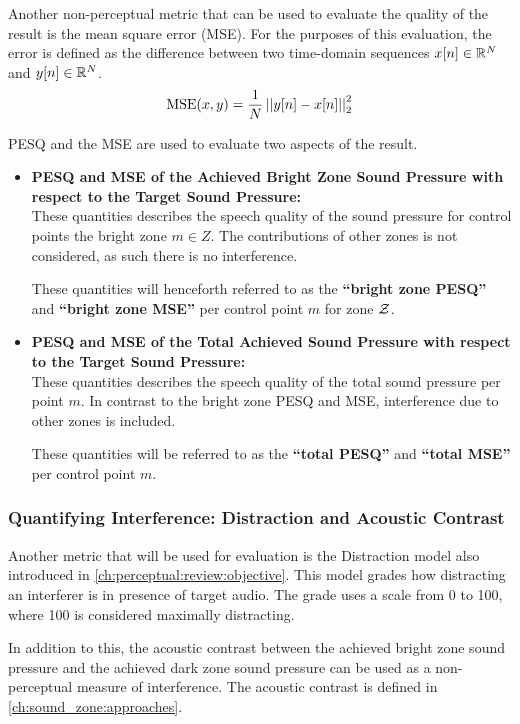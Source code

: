 Another non-perceptual metric that can be used to evaluate the quality of the result is the mean square error (MSE).
For the purposes of this evaluation, the error is defined as the difference between two time-domain sequences $x[n]\in\mathbb{R}^{N}$
and $y[n]\in\mathbb{R}^{N}$. 
\begin{equation}
    \text{MSE}(x,y) = \frac{1}{N}\norm[2][2]{y[n] - x[n]} 
\end{equation}

PESQ and the MSE are used to evaluate two aspects of the result.
\begin{itemize}
    \item \textbf{PESQ and MSE of the Achieved Bright Zone Sound Pressure with respect to the Target Sound Pressure:}\\
        These quantities describes the speech quality of the sound pressure for control points the bright zone $m\in Z$.
        The contributions of other zones is not considered, as such there is no interference.

        These quantities will henceforth referred to as the \textbf{``bright zone PESQ''} and \textbf{``bright zone MSE''} per control point $m$ for zone $\mathcal{Z}$.
    \item \textbf{PESQ and MSE of the Total Achieved Sound Pressure with respect to the Target Sound Pressure:}\\
        These quantities describes the speech quality of the total sound pressure per point $m$.
        In contrast to the bright zone PESQ and MSE, interference due to other zones is included.

        These quantities will be referred to as the \textbf{``total PESQ''} and \textbf{``total MSE''} per control point $m$. 
\end{itemize}

\subsubsection*{Quantifying Interference: Distraction and Acoustic Contrast}
Another metric that will be used for evaluation is the Distraction model also introduced in \autoref{ch:perceptual:review:objective}.
This model grades how distracting an interferer is in presence of target audio.
The grade uses a scale from 0 to 100, where 100 is considered maximally distracting.

In addition to this, the acoustic contrast between the 
achieved bright zone sound pressure and the achieved dark zone sound pressure can be used as a non-perceptual measure of interference.
The acoustic contrast is defined in \autoref{ch:sound_zone:approaches}.

